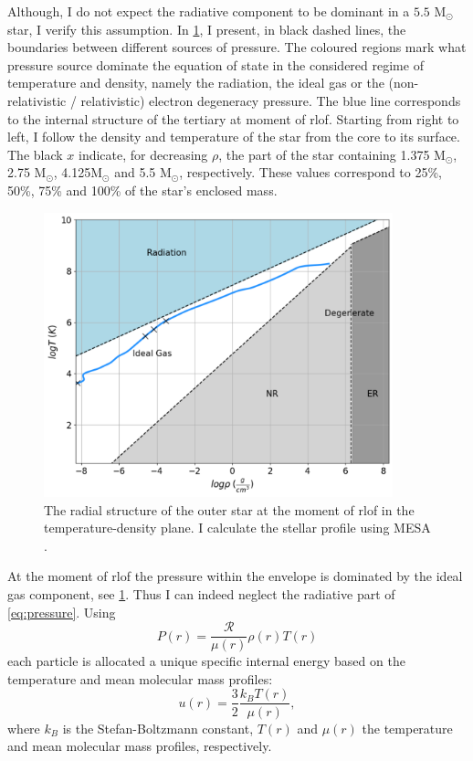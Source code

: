 Although, I do not expect the radiative component to be dominant in a $5.5$ M$_{\odot}$ star, I verify this assumption. In \cref{fig:eos}, I present, in black dashed lines, the boundaries between different sources of pressure. The coloured regions mark what pressure source dominate the equation of state in the considered regime of temperature and density, namely the radiation, the ideal gas or the (non-relativistic / relativistic) electron degeneracy pressure. The blue line corresponds to the internal structure of the tertiary at moment of \ac{rlof}. Starting from right to left, I follow the density and temperature of the star from the core to its surface. The black $x$ indicate, for decreasing $\rho$, the part of the star containing 1.375 M$_{\odot}$, 2.75 M$_{\odot}$, 4.125M$_{\odot}$ and 5.5 M$_{\odot}$, respectively. These values correspond to 25\%, 50\%, 75\% and 100\% of the star's enclosed mass.
\begin{figure}[H]
    \centering
    \includegraphics[width=0.9\textwidth]{Thesis/graphs/eos.pdf}
    \caption{ The radial structure of the outer star at the moment of \ac{rlof} in the  temperature-density plane. I calculate the stellar profile using MESA \citep{paxton2010modules,paxton2013modules,paxton2015modules,paxton2019modules}.}
    \label{fig:eos}
\end{figure}
At the moment of \ac{rlof} the pressure within the envelope is dominated by the ideal gas component, see \cref{fig:eos}. Thus I can indeed neglect the radiative part of \cref{eq:pressure}. Using
\begin{equation}\label{eq:pressure_ideal_gass}
    P(r) =  \frac{\mathcal{R}}{\mu(r)} \rho(r) T(r)
\end{equation}
each particle is allocated a unique specific internal energy based on the temperature and mean molecular mass profiles:
\begin{equation}\label{eq:internal_energy}
    u(r) = \frac{3}{2} \frac{k_B T(r)}{\mu(r)},
\end{equation}
where $k_B$ is the Stefan-Boltzmann constant, $T(r)$ and $\mu(r)$ the temperature and mean molecular mass profiles, respectively.


